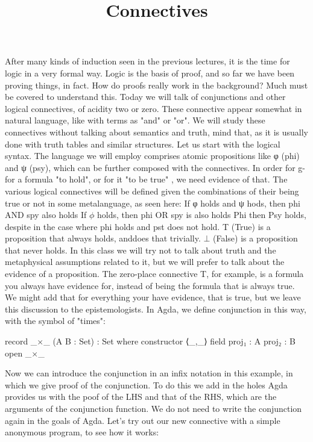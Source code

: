 \documentclass{lecturenotes}
\title{Connectives}
\begin{document}
\maketitle


After many kinds of induction seen in the previous lectures, it is the time for logic in a very formal way.
Logic is the basis of proof, and so far we have been proving things, in fact. How do proofs really work in the background?
Much must be covered to understand this. Today we will talk of conjunctions and other logical connectives, of acidity two or zero.
These connective appear somewhat in natural language, like with terms as "and" or "or".
We will study these connectives without talking about semantics and truth, mind that, as it is usually done with truth tables and similar structures. 
Let us start with the logical syntax. The language we will employ comprises atomic propositions like φ (phi) and ψ (psy), which can be further composed with the connectives.
In order for g-for a formula "to hold", or for it "to be true" , we need evidence of that.
The various logical connectives will be defined given the combinations of their being true or not in some metalanguage, as seen here:
If φ  holds and ψ hods, then phi AND spy also holds
If $\phi$ holds, then phi OR spy is also holds
Phi then Psy holds, despite in the case where phi holds and pst does not hold.
T (True) is a proposition that always holds, anddoes that trivially.
$\bot$ (False) is a proposition that never holds.
In this class we will try not to talk about truth and the metaphysical assumptions related to it, but we will prefer to talk about the evidence of a proposition.
The zero-place connective T, for example, is a formula you always have evidence for, instead of being the formula that is always true.
We might add that for everything your have evidence, that is true, but we leave this discussion to the epistemologists.
In Agda, we define conjunction in this way, with the symbol of "times":

\begin{code}
record _×_ (A B : Set) : Set where
  constructor ⟨_,_⟩
  field
    proj₁ : A
    proj₂ : B
open _×_
\end{code}

Now we can introduce the conjunction in an infix notation in this example, in which we give proof of the conjunction.
To do this we add in the holes Agda provides us with the poof of the LHS and that of the RHS, which are the arguments of the conjunction function.
We do not need to write the conjunction again in the goals of Agda.
Let's try out our new connective with a simple anonymous program, to see how it works: 
\end{document}
